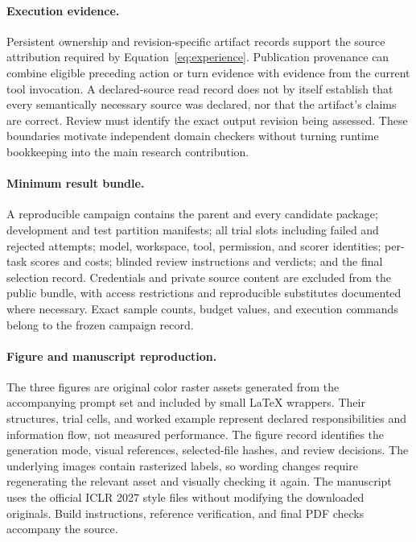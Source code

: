 \paragraph{Execution evidence.}
Persistent ownership and revision-specific artifact records support the source attribution required by Equation~\ref{eq:experience}. Publication provenance can combine eligible preceding action or turn evidence with evidence from the current tool invocation. A declared-source read record does not by itself establish that every semantically necessary source was declared, nor that the artifact's claims are correct. Review must identify the exact output revision being assessed. These boundaries motivate independent domain checkers without turning runtime bookkeeping into the main research contribution.

\paragraph{Minimum result bundle.}
A reproducible campaign contains the parent and every candidate package; development and test partition manifests; all trial slots including failed and rejected attempts; model, workspace, tool, permission, and scorer identities; per-task scores and costs; blinded review instructions and verdicts; and the final selection record. Credentials and private source content are excluded from the public bundle, with access restrictions and reproducible substitutes documented where necessary. Exact sample counts, budget values, and execution commands belong to the frozen campaign record.

\paragraph{Figure and manuscript reproduction.}
The three figures are original color raster assets generated from the accompanying prompt set and included by small LaTeX wrappers. Their structures, trial cells, and worked example represent declared responsibilities and information flow, not measured performance. The figure record identifies the generation mode, visual references, selected-file hashes, and review decisions. The underlying images contain rasterized labels, so wording changes require regenerating the relevant asset and visually checking it again. The manuscript uses the official ICLR 2027 style files without modifying the downloaded originals. Build instructions, reference verification, and final PDF checks accompany the source.

